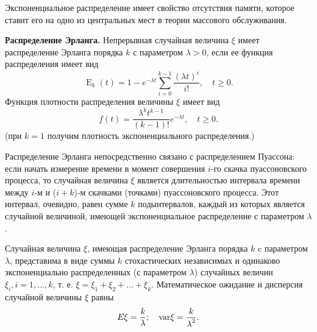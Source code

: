 Экспоненциальное распределение имеет свойство отсутствия памяти, которое ставит его на одно из центральных мест в теории массового обслуживания.

\textbf{Распределение Эрланга.} Непрерывная случайная величина $\xi$ имеет распределение Эрланга порядка $k$ с параметром $\lambda > 0$, если ее функция распределения имеет вид
\begin{equation*}
 \mathop E\nolimits_k (t) = 1 - {e^{ - \lambda t}}\sum\limits_{i = 0}^{k  - 1} {\frac{{{{(\lambda t)}^i}}}{{i!}}} , \quad t \ge 0.
\end{equation*}
Функция плотности распределения величины $\xi$ имеет вид
\begin{equation*}
 f(t) = \frac{{{\lambda ^k }{t^{k  - 1}}}}{{(k - 1)!}}{e^{ - \lambda t}}, \quad t \ge 0.
\end{equation*}
(при $k = 1$ получим плотность экспоненциального распределения.)

Распределение Эрланга непосредственно связано с распределением Пуассона: если начать измерение времени в момент совершения  $i$-го скачка пуассоновского процесса, то случайная величина $\xi$ является длительностью интервала времени между $i$-м и ($i+k$)-м скачками (точками) пуассоновского процесса. Этот интервал, очевидно, равен сумме $k$ подынтервалов, каждый из которых является случайной величиной, имеющей экспоненциальное распределение с параметром $\lambda$. 

Случайная величина $\xi$, имеющая распределение Эрланга порядка $k$ c параметром $\lambda$, представима в виде суммы $k$ стохастических независимых и одинаково экспоненциально распределенных (с параметром $\lambda$) случайных величин ${\xi _i},i = 1,...,k$, т. е. $\xi  = {\xi _1} + {\xi _2} + ... + {\xi _k }$. Математическое ожидание и дисперсия случайной величины $\xi$ равны
\begin{equation*}
E\xi  = \frac{k}{\lambda }; \quad {\mathop{\rm var}} \xi  = \frac{k}{{\mathop \lambda \nolimits^2 }}.
\end{equation*}

